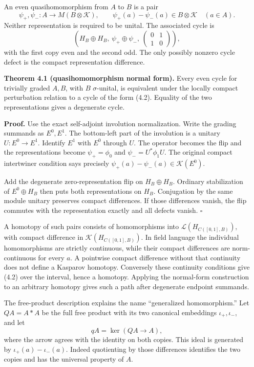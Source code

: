 \documentclass[
  11pt,
]{article}
\begin{document}
An even quasihomomorphism from \(A\) to \(B\) is a pair \[
\psi_+,\psi_-:A\longrightarrow M(B\otimes\mathcal K),
\qquad
\psi_+(a)-\psi_-(a)\in B\otimes\mathcal K
\quad(a\in A).
\tag{4.1}
\] Neither representation is required to be unital. The associated cycle
is \[
\left(H_B\oplus H_B,\ \psi_+\oplus\psi_-,\
\begin{pmatrix}0&1\\1&0\end{pmatrix}\right),
\tag{4.2}
\] with the first copy even and the second odd. The only possibly
nonzero cycle defect is the compact representation difference.

\textbf{Theorem 4.1 (quasihomomorphism normal form).} Every even cycle
for trivially graded \(A,B\), with \(B\) \(\sigma\)-unital, is
equivalent under the locally compact perturbation relation to a cycle of
the form (4.2). Equality of the two representations gives a degenerate
cycle.

\textbf{Proof.} Use the exact self-adjoint involution normalization.
Write the grading summands as \(E^0,E^1\). The bottom-left part of the
involution is a unitary \(U:E^0\to E^1\). Identify \(E^1\) with \(E^0\)
through \(U\). The operator becomes the flip and the representations
become \(\psi_+=\phi_0\) and \(\psi_-=U^*\phi_1U\). The original compact
intertwiner condition says precisely
\(\psi_+(a)-\psi_-(a)\in\mathcal K(E^0)\).

Add the degenerate zero-representation flip on \(H_B\oplus H_B\).
Ordinary stabilization of \(E^0\oplus H_B\) then puts both
representations on \(H_B\). Conjugation by the same module unitary
preserves compact differences. If those differences vanish, the flip
commutes with the representation exactly and all defects vanish.
\(\square\)

A homotopy of such pairs consists of homomorphisms into
\(\mathcal L(H_{C([0,1],B)})\), with compact difference in
\(\mathcal K(H_{C([0,1],B)})\). In field language the individual
homomorphisms are strictly continuous, while their compact differences
are norm-continuous for every \(a\). A pointwise compact difference
without that continuity does not define a Kasparov homotopy. Conversely
these continuity conditions give (4.2) over the interval, hence a
homotopy. Applying the normal-form construction to an arbitrary homotopy
gives such a path after degenerate endpoint summands.

The free-product description explains the name ``generalized
homomorphism.'' Let \(QA=A*A\) be the full free product with its two
canonical embeddings \(\iota_+,\iota_-\), and let \[
qA=\ker(QA\longrightarrow A),
\tag{4.3}
\] where the arrow agrees with the identity on both copies. This ideal
is generated by \(\iota_+(a)-\iota_-(a)\). Indeed quotienting by those
differences identifies the two copies and has the universal property of
\(A\).
\end{document}
